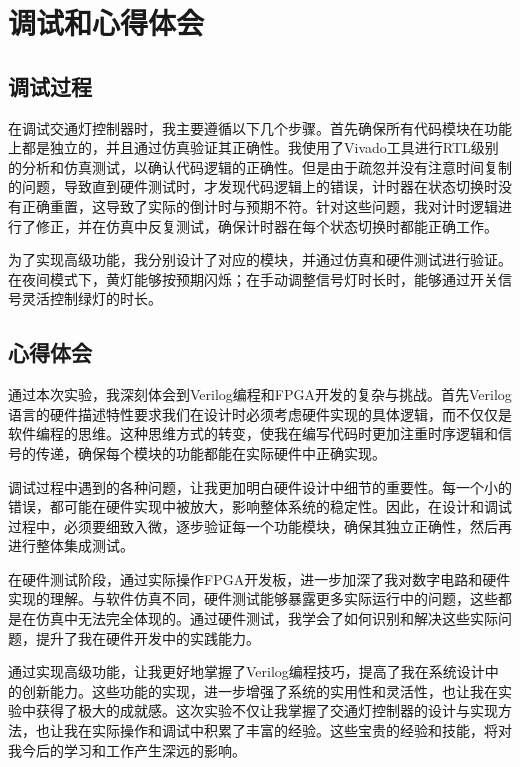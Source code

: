 \documentclass[a4,10pt,zihao=-4]{ctexart}
\begin{document}
\section{调试和心得体会}

\subsection{调试过程}
在调试交通灯控制器时，我主要遵循以下几个步骤。首先确保所有代码模块在功能上都是独立的，并且通过仿真验证其正确性。我使用了Vivado工具进行RTL级别的分析和仿真测试，以确认代码逻辑的正确性。但是由于疏忽并没有注意时间复制的问题，导致直到硬件测试时，才发现代码逻辑上的错误，计时器在状态切换时没有正确重置，这导致了实际的倒计时与预期不符。针对这些问题，我对计时逻辑进行了修正，并在仿真中反复测试，确保计时器在每个状态切换时都能正确工作。

为了实现高级功能，我分别设计了对应的模块，并通过仿真和硬件测试进行验证。在夜间模式下，黄灯能够按预期闪烁；在手动调整信号灯时长时，能够通过开关信号灵活控制绿灯的时长。


\subsection{心得体会}
通过本次实验，我深刻体会到Verilog编程和FPGA开发的复杂与挑战。首先Verilog语言的硬件描述特性要求我们在设计时必须考虑硬件实现的具体逻辑，而不仅仅是软件编程的思维。这种思维方式的转变，使我在编写代码时更加注重时序逻辑和信号的传递，确保每个模块的功能都能在实际硬件中正确实现。

调试过程中遇到的各种问题，让我更加明白硬件设计中细节的重要性。每一个小的错误，都可能在硬件实现中被放大，影响整体系统的稳定性。因此，在设计和调试过程中，必须要细致入微，逐步验证每一个功能模块，确保其独立正确性，然后再进行整体集成测试。

在硬件测试阶段，通过实际操作FPGA开发板，进一步加深了我对数字电路和硬件实现的理解。与软件仿真不同，硬件测试能够暴露更多实际运行中的问题，这些都是在仿真中无法完全体现的。通过硬件测试，我学会了如何识别和解决这些实际问题，提升了我在硬件开发中的实践能力。

通过实现高级功能，让我更好地掌握了Verilog编程技巧，提高了我在系统设计中的创新能力。这些功能的实现，进一步增强了系统的实用性和灵活性，也让我在实验中获得了极大的成就感。这次实验不仅让我掌握了交通灯控制器的设计与实现方法，也让我在实际操作和调试中积累了丰富的经验。这些宝贵的经验和技能，将对我今后的学习和工作产生深远的影响。
\end{document}
